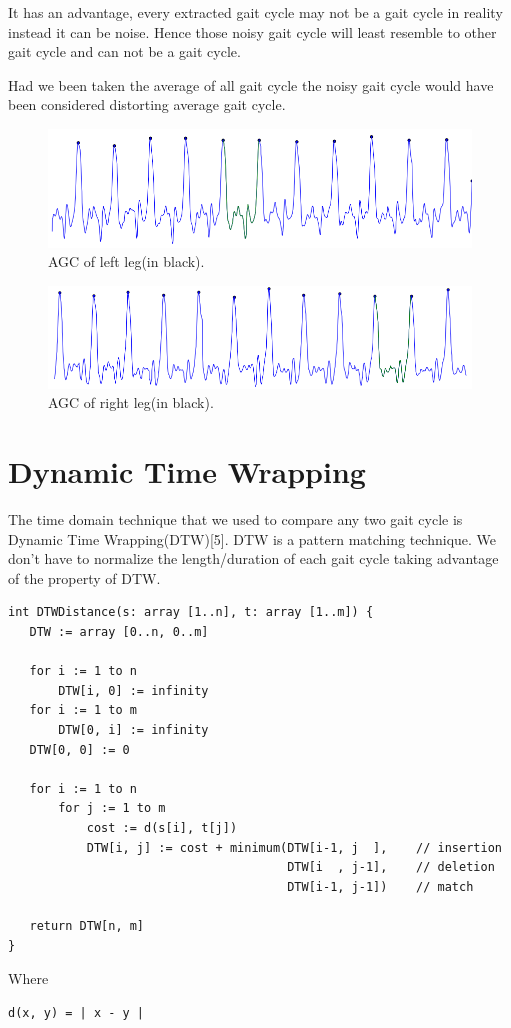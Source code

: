 \documentclass[a4paper]{report}
\begin{document}
It has an advantage, every extracted gait cycle may not be a gait cycle in reality instead it can be noise. Hence those noisy gait cycle will least resemble to other gait cycle and can not be a gait cycle. 

Had we been taken the average of all gait cycle the noisy gait cycle would have been considered distorting average gait cycle.

\begin{figure}
\includegraphics[scale=0.4]{pictures/agc_left_crop.png}
\caption{AGC of left leg(in black).}
\end{figure}

\begin{figure}
\includegraphics[scale=0.4]{pictures/agc_right_crop.png}
\caption{AGC of right leg(in black).}
\end{figure}


\section{Dynamic Time Wrapping}
The time domain technique that we used to compare any two gait cycle is Dynamic Time Wrapping(DTW)[5]. DTW is a pattern matching technique. We don’t have to normalize the length/duration of each gait cycle taking advantage of the property of DTW.


\begin{verbatim}
int DTWDistance(s: array [1..n], t: array [1..m]) {
   DTW := array [0..n, 0..m]

   for i := 1 to n
       DTW[i, 0] := infinity
   for i := 1 to m
       DTW[0, i] := infinity
   DTW[0, 0] := 0

   for i := 1 to n
       for j := 1 to m
           cost := d(s[i], t[j])
           DTW[i, j] := cost + minimum(DTW[i-1, j  ],    // insertion
                                       DTW[i  , j-1],    // deletion
                                       DTW[i-1, j-1])    // match

   return DTW[n, m]
}
\end{verbatim}
Where \begin{verbatim}d(x, y) = | x - y |\end{verbatim}\cite{dtw1}
\end{document}
